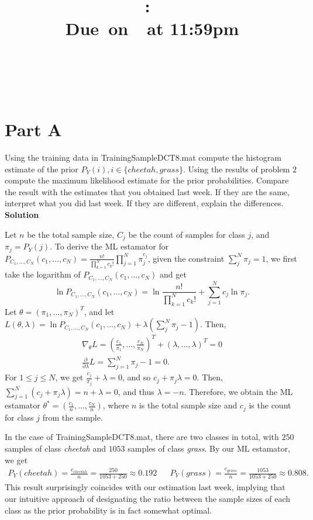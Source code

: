 \documentclass{article}
\title{
    \vspace{2in}
    \textmd{\textbf{\hmwkClass:\ \hmwkTitle}}\\
    \normalsize\vspace{0.1in}\small{Due\ on\ \hmwkDueDate\ at 11:59pm}\\
    \vspace{0.1in}\large{\textit{\hmwkClassInstructor}} \\
    \vspace{3in}
}
\author{
  \hmwkAuthorName \\
  \vspace{0.1in}\small\hmwkPID
}
\date{}
\begin{document}
\maketitle

\pagebreak

\section*{Part A}

Using the training data in {\selectfont TrainingSampleDCT\textunderscore8.mat} compute the histogram estimate of the prior
$P_Y(i), i \in \{cheetah, grass\}$. Using the results of problem $2$ compute the maximum likelihood estimate
for the prior probabilities. Compare the result with the estimates that you obtained last week. If they
are the same, interpret what you did last week. If they are different, explain the differences.
\\

\textbf{\large Solution}

Let $n$ be the total sample size, $C_j$ be the count of samples for class $j$, and $\pi_j = P_Y(j)$.
To derive the ML estamator for $P_{C_1,\dots,C_N}(c_1,\dots,c_N) = \frac{n!}{\prod_{k = 1}^N c_k!}\prod^N_{j = 1}\pi^{c_j}_j$, given the constraint $\sum^N_j \pi_j = 1$,
we first take the logarithm of $P_{C_1,\dots,C_N}(c_1,\dots,c_N)$ and get
\[
  \ln P_{C_1,\dots,C_N}(c_1,\dots,c_N) = \ln \frac{n!}{\prod_{k = 1}^N c_k!} + \sum^N_{j = 1} c_j \ln \pi_j.
\]
Let $\theta = (\pi_1, \dots, \pi_N)^T$, and let $L(\theta, \lambda) = \ln P_{C_1,\dots,C_N}(c_1,\dots,c_N) + \lambda\left(\sum^N_j \pi_j - 1\right)$.
Then,
\begin{gather*}
  \nabla_{\theta}L = \left(\frac{c_1}{\pi_1},\dots, \frac{c_N}{\pi_N}\right)^T + (\lambda, \dots, \lambda)^T = 0 \\
  \frac{\partial}{\partial \lambda}L = \sum_{j = 1}^N \pi_j - 1 = 0.
\end{gather*}
For $1 \leq j \leq N$, we get $\frac{c_j}{\pi_j} + \lambda = 0$, and so $c_j + \pi_j\lambda = 0$. 
Then, $\sum^N_{j = 1} (c_j + \pi_j\lambda) = n + \lambda = 0$, and thus $ \lambda = -n$. 
Therefore, we obtain the ML estamator $\theta^* = \left(\frac{c_1}{n},\dots, \frac{c_N}{n}\right)$, where $n$ is the total sample size and $c_j$ is the count for class $j$ from the sample.

In the case of {\selectfont TrainingSampleDCT\textunderscore8.mat}, there are two classes in total, with $250$ samples of class \textit{cheetah} and $1053$ samples of class \textit{grass}.
By our ML estamator, we get
\begin{align*}
  P_Y(cheetah) = \frac{c_{cheetah}}{n} = \frac{250}{1053 + 250} \approx 0.192 && P_Y(grass) = \frac{c_{grass}}{n} = \frac{1053}{1053 + 250} \approx 0.808.
\end{align*}
This result surprisingly coincides with our estimation last week, implying that our intuitive approach of designating the ratio between the sample sizes of each class as the prior probability is in fact somewhat optimal.
\end{document}

